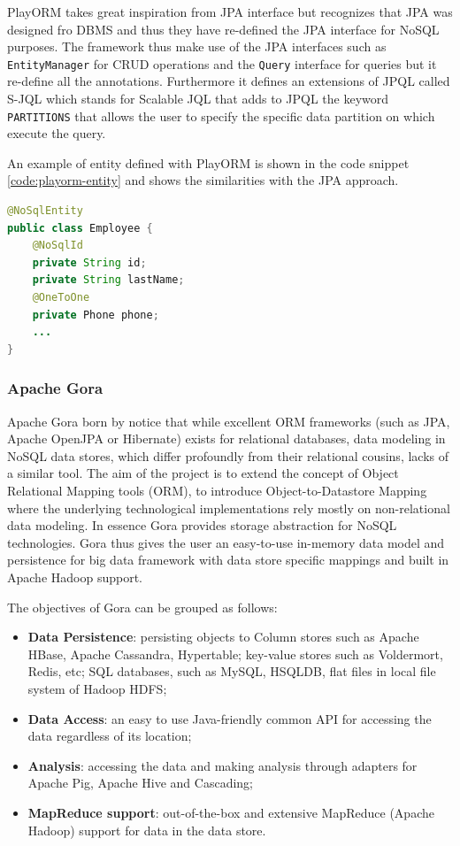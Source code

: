 \newparagraph PlayORM takes great inspiration from JPA interface but recognizes that JPA was designed fro DBMS and thus they have re-defined the JPA interface  for NoSQL purposes.
The framework thus make use of the JPA interfaces such as \texttt{EntityManager} for CRUD operations and the \texttt{Query} interface for queries but it re-define all the annotations.
Furthermore it defines an extensions of JPQL called S-JQL which stands for Scalable JQL that adds to JPQL the keyword \texttt{PARTITIONS} that allows the user to specify the specific data partition on which execute the query.

\noindent An example of entity defined with PlayORM is shown in the code snippet \ref{code:playorm-entity} and shows the similarities with the JPA approach.

\begin{lstlisting}[language=Java, caption=PlayORM object mapping, label=code:playorm-entity]
@NoSqlEntity
public class Employee {
    @NoSqlId
    private String id;
    private String lastName;
    @OneToOne
    private Phone phone;
    ...
}
\end{lstlisting}

\subsubsection{Apache Gora}
Apache Gora \cite{online:apache-gora} born by notice that while excellent ORM frameworks (such as JPA, Apache OpenJPA or Hibernate) exists for relational databases, data modeling in NoSQL data stores, which differ profoundly from their relational cousins, lacks of a similar tool. The aim of the project is to extend the concept of Object Relational Mapping tools (ORM), to introduce Object-to-Datastore Mapping where the underlying technological implementations rely mostly on non-relational data modeling. In essence Gora provides storage abstraction for NoSQL technologies. 
Gora thus gives the user an easy-to-use in-memory data model and persistence for big data framework with data store specific mappings and built in Apache Hadoop support.

\newparagraph The objectives of Gora can be grouped as follows:
\begin{itemize}
\item \textbf{Data Persistence}: persisting objects to Column stores such as Apache HBase, Apache Cassandra, Hypertable; key-value stores such as Voldermort, Redis, etc; SQL databases, such as MySQL, HSQLDB, flat files in local file system of Hadoop HDFS; 
\item \textbf{Data Access}: an easy to use Java-friendly common API for accessing the data regardless of its location; 
\item \textbf{Analysis}: accessing the data and making analysis through adapters for Apache Pig, Apache Hive and Cascading;
\item \textbf{MapReduce support}: out-of-the-box and extensive MapReduce (Apache Hadoop) support for data in the data store.
\end{itemize}

